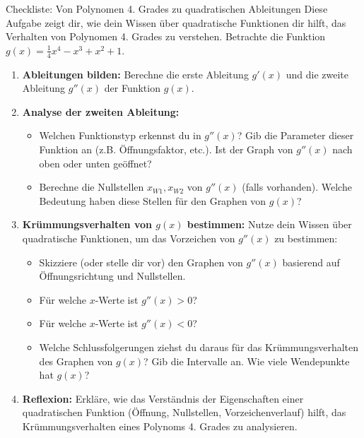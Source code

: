 \begin{aufgabenumgebung}{Checkliste: Von Polynomen 4. Grades zu quadratischen Ableitungen}
Diese Aufgabe zeigt dir, wie dein Wissen über quadratische Funktionen dir hilft, das Verhalten von Polynomen 4. Grades zu verstehen.
Betrachte die Funktion $g(x) = \frac{1}{4}x^4 - x^3 + x^2 + 1$.

\begin{enumerate}[label=(\alph*)]
    \item \textbf{Ableitungen bilden:} Berechne die erste Ableitung $g'(x)$ und die zweite Ableitung $g''(x)$ der Funktion $g(x)$.
    \item \textbf{Analyse der zweiten Ableitung:}
    \begin{itemize}
        \item Welchen Funktionstyp erkennst du in $g''(x)$? Gib die Parameter dieser Funktion an (z.B. Öffnungsfaktor, etc.). Ist der Graph von $g''(x)$ nach oben oder unten geöffnet?
        \item Berechne die Nullstellen $x_{W1}, x_{W2}$ von $g''(x)$ (falls vorhanden). Welche Bedeutung haben diese Stellen für den Graphen von $g(x)$?
    \end{itemize}
    \item \textbf{Krümmungsverhalten von $g(x)$ bestimmen:}
    Nutze dein Wissen über quadratische Funktionen, um das Vorzeichen von $g''(x)$ zu bestimmen:
    \begin{itemize}
        \item Skizziere (oder stelle dir vor) den Graphen von $g''(x)$ basierend auf Öffnungsrichtung und Nullstellen.
        \item Für welche $x$-Werte ist $g''(x) > 0$?
        \item Für welche $x$-Werte ist $g''(x) < 0$?
        \item Welche Schlussfolgerungen ziehst du daraus für das Krümmungsverhalten des Graphen von $g(x)$? Gib die Intervalle an. Wie viele Wendepunkte hat $g(x)$?
    \end{itemize}
    \item \textbf{Reflexion:} Erkläre, wie das Verständnis der Eigenschaften einer quadratischen Funktion (Öffnung, Nullstellen, Vorzeichenverlauf) hilft, das Krümmungsverhalten eines Polynoms 4. Grades zu analysieren.
\end{enumerate}
\end{aufgabenumgebung}

